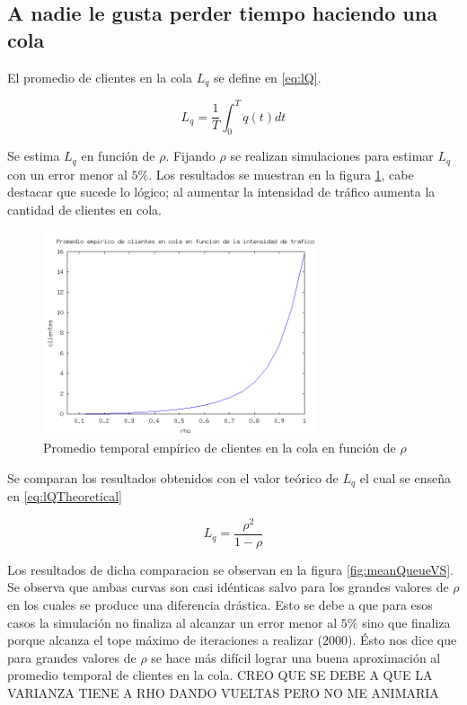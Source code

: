 \documentclass{sig-alternate}
\begin{document}
\subsection{A nadie le gusta perder tiempo haciendo una cola}
\label{sec:parte1}
El promedio de clientes en la cola $L_q$ se define en \eqref{eq:lQ}.

\begin{equation}
\label{eq:lQ}
L_q = \dfrac{1}{T} \int_{0}^{T} q(t) dt
\end{equation}

Se estima $L_q$ en funci\'on de $\rho$. Fijando $\rho$ se realizan simulaciones para estimar $L_q$
con un error menor al $5\%$. Los resultados se muestran en la figura \ref{fig:meanQueue}, cabe destacar
que sucede lo l\'ogico; al aumentar la intensidad de tr\'afico aumenta la cantidad de clientes en cola.\\

\begin{figure}[ht]
\begin{center}
\includegraphics[width=8cm]{queueEmpiricVSrho}
\caption{\label{fig:meanQueue} Promedio temporal emp\'irico de clientes en la cola en funci\'on de $\rho$}
\end{center}
\end{figure}

Se comparan los resultados obtenidos con el valor te\'orico de $L_q$ el cual se ense\~na en \eqref{eq:lQTheoretical}

\begin{equation}
\label{eq:lQTheoretical}
L_q = \dfrac{\rho^{2}}{1 - \rho}
\end{equation}

Los resultados de dicha comparacion se observan en la figura \ref{fig:meanQueueVS}. Se observa que ambas curvas
son casi id\'enticas salvo para los grandes valores de $\rho$ en los cuales se produce una diferencia dr\'astica.
Esto se debe a que para esos casos la simulaci\'on no finaliza al alcanzar un error menor al $5\%$ sino que finaliza
porque alcanza el tope m\'aximo de iteraciones a realizar ($2000$). \'Esto nos dice que para grandes valores de $\rho$
se hace m\'as dif\'icil lograr una buena aproximaci\'on al promedio temporal de clientes en la cola.
CREO QUE SE DEBE A QUE LA VARIANZA TIENE A RHO DANDO VUELTAS PERO NO ME ANIMARIA
\end{document}
